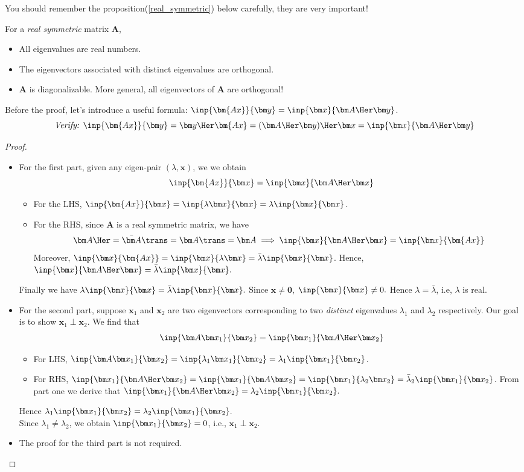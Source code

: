 You should remember the proposition(\ref{real_symmetric}) below carefully, they are very important!
\begin{proposition}\label{real_symmetric}
For a \textit{real symmetric} matrix $\bm A$, 
\begin{itemize}
\item
All eigenvalues are real numbers.
\item
The eigenvectors associated with distinct eigenvalues are orthogonal.
\item
$\bm A$ is diagonalizable. More general, all eigenvectors of $\bm A$ are orthogonal!
\end{itemize}
\end{proposition}
Before the proof, let's introduce a useful formula: $\inp{\bm{Ax}}{\bm y}=\inp{\bm x}{\bm A\Her\bm y}$.\\
\[
\textit{Verify: }\inp{\bm{Ax}}{\bm y}=\bm y\Her\bm{Ax}=(\bm A\Her\bm y)\Her\bm x=\inp{\bm x}{\bm A\Her\bm y}
\]
\begin{proof}
\begin{itemize}
\item
For the first part, given any eigen-pair $(\lambda, \bm x)$, we we obtain
\[
\inp{\bm{Ax}}{\bm x}=\inp{\bm x}{\bm A\Her\bm x}
\]
\begin{itemize}
\item
For the LHS, $\inp{\bm{Ax}}{\bm x}=\inp{\lambda\bm x}{\bm x}=\lambda\inp{\bm x}{\bm x}$.
\item
For the RHS, since $\bm A$ is a real symmetric matrix, we have 
\[
\bm A\Her=\bar{\bm A}\trans=\bm A\trans=\bm A\implies
\inp{\bm x}{\bm A\Her\bm x}=\inp{\bm x}{\bm{Ax}}
\]
Moreover, $\inp{\bm x}{\bm{Ax}}=\inp{\bm x}{\lambda\bm x}=\bar\lambda\inp{\bm x}{\bm x}$. Hence, $\inp{\bm x}{\bm A\Her\bm x}=\bar\lambda\inp{\bm x}{\bm x}.$
\end{itemize}
Finally we have $\lambda\inp{\bm x}{\bm x}=\bar\lambda\inp{\bm x}{\bm x}.$
Since $\bm x\ne\bm 0$, $\inp{\bm x}{\bm x}\ne0.$ Hence $\lambda=\bar\lambda$, i.e, $\lambda$ is real.
\item
For the second part, suppose $\bm x_1$ and $\bm x_2$ are two eigenvectors corresponding to two \emph{distinct} eigenvalues $\lambda_1$ and $\lambda_2$ respectively. Our goal is to show $\bm x_1\perp\bm x_2$. We find that
\[
\inp{\bm A\bm x_1}{\bm x_2}=\inp{\bm x_1}{\bm A\Her\bm x_2}
\]
\begin{itemize}
\item
For LHS, $\inp{\bm A\bm x_1}{\bm x_2}=\inp{\lambda_1\bm x_1}{\bm x_2}=\lambda_1\inp{\bm x_1}{\bm x_2}$.
\item
For RHS, $\inp{\bm x_1}{\bm A\Her\bm x_2}=\inp{\bm x_1}{\bm A\bm x_2}=\inp{\bm x_1}{\lambda_2\bm x_2}=\bar\lambda_2\inp{\bm x_1}{\bm x_2}$. From part one we derive that $\inp{\bm x_1}{\bm A\Her\bm x_2}=\lambda_2\inp{\bm x_1}{\bm x_2}.$
\end{itemize}
Hence $\lambda_1\inp{\bm x_1}{\bm x_2}=\lambda_2\inp{\bm x_1}{\bm x_2}.$\\ Since $\lambda_1\ne\lambda_2$, we obtain $\inp{\bm x_1}{\bm x_2}=0$, i.e., $\bm x_1\perp\bm x_2.$
\item
The proof for the third part is not required.
\end{itemize}
\end{proof}
